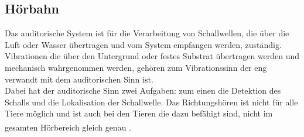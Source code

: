 \documentclass[12pt,a4paper,pdftex]{article}
\begin{document}
\subsection{Hörbahn}

Das auditorische System ist für die Verarbeitung von Schallwellen, die über die Luft oder Wasser übertragen und vom System empfangen werden, zuständig. Vibrationen die über den Untergrund oder festes Substrat übertragen werden und mechanisch wahrgenommen werden, gehören zum Vibrationssinn der eng verwandt mit dem auditorischen Sinn ist.
\\
\noindent Dabei hat der auditorische Sinn zwei Aufgaben: zum einen die Detektion des Schalls und die Lokalisation der Schallwelle. Das Richtungshören ist nicht für alle Tiere möglich und ist auch bei den Tieren die dazu befähigt sind, nicht im gesamten Hörbereich gleich genau \textsuperscript{\cite[18]{penzlin2005tierphys}}.
\end{document}
